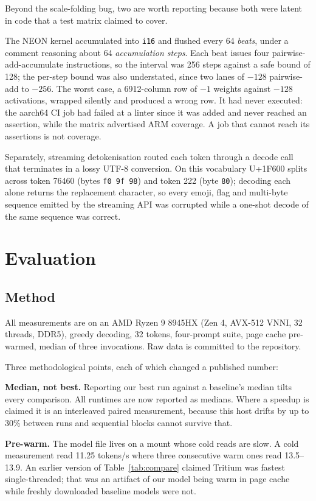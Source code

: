 \documentclass[10pt,twocolumn]{article}
\begin{document}
Beyond the scale-folding bug, two are worth reporting because both were latent
in code that a test matrix claimed to cover.

The NEON kernel accumulated into \texttt{i16} and flushed every 64 \emph{beats},
under a comment reasoning about 64 \emph{accumulation steps}. Each beat issues
four pairwise-add-accumulate instructions, so the interval was 256 steps against
a safe bound of 128; the per-step bound was also understated, since two lanes of
$-128$ pairwise-add to $-256$. The worst case, a 6912-column row of $-1$ weights
against $-128$ activations, wrapped silently and produced a wrong row. It had
never executed: the aarch64 CI job had failed at a linter since it was added and
never reached an assertion, while the matrix advertised ARM coverage. A job that
cannot reach its assertions is not coverage.

Separately, streaming detokenisation routed each token through a decode call
that terminates in a lossy UTF-8 conversion. On this vocabulary U+1F600 splits
across token 76460 (bytes \texttt{f0 9f 98}) and token 222 (byte \texttt{80});
decoding each alone returns the replacement character, so every emoji, flag and
multi-byte sequence emitted by the streaming API was corrupted while a one-shot
decode of the same sequence was correct.

\section{Evaluation}
\label{sec:eval}

\subsection{Method}

All measurements are on an AMD Ryzen 9 8945HX (Zen 4, AVX-512 VNNI, 32 threads,
DDR5), greedy decoding, 32 tokens, four-prompt suite, page cache pre-warmed,
median of three invocations. Raw data is committed to the repository.

Three methodological points, each of which changed a published number:

\textbf{Median, not best.} Reporting our best run against a baseline's median
tilts every comparison. All runtimes are now reported as medians. Where a
speedup is claimed it is an interleaved paired measurement, because this host
drifts by up to 30\% between runs and sequential blocks cannot survive that.

\textbf{Pre-warm.} The model file lives on a mount whose cold reads are slow. A
cold measurement read 11.25 tokens/s where three consecutive warm ones read
13.5--13.9. An earlier version of Table~\ref{tab:compare} claimed Tritium was
fastest single-threaded; that was an artifact of our model being warm in page
cache while freshly downloaded baseline models were not.
\end{document}
